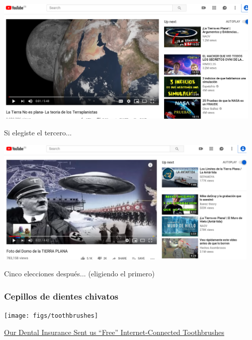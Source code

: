 \documentclass[17pt,aspectratio=169]{beamer}
\begin{document}

\begin{frame}

\begin{center}
\includegraphics[height=6cm]{figs/tierra-no-plana}
\end{center}

Si elegiste el tercero...
\end{frame}


\begin{frame}

\begin{center}
\includegraphics[height=6cm]{figs/tierra-plana}
\end{center}

Cinco elecciones después... (eligiendo el primero)
\end{frame}



\begin{frame}
\frametitle{Cepillos de dientes chivatos}

\begin{center}
\texttt{[image: figs/toothbrushes]}
\end{center}
\begin{flushright}
{\tiny \href{https://wolfstreet.com/2018/04/14/our-dental-insurance-sent-us-free-internet-connected-toothbrushes-and-this-is-what-happened-next/}{Our Dental Insurance Sent us “Free” Internet-Connected Toothbrushes}}
\end{flushright}

\end{frame}
\end{document}
